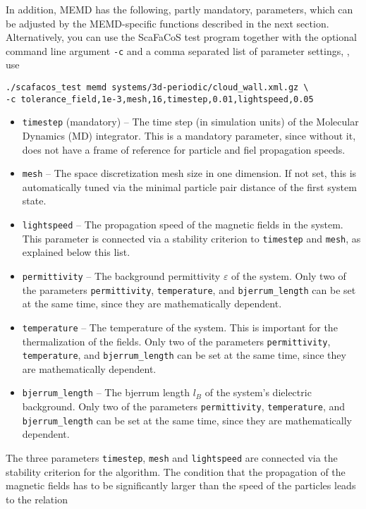 In addition, MEMD has the following, partly mandatory, parameters, which can be adjusted by the MEMD-specific functions described in the next section. Alternatively, you can use the ScaFaCoS test program together with the optional command line argument \verb!-c! and a comma separated list of parameter settings, \eg{}, use
\begin{verbatim}
./scafacos_test memd systems/3d-periodic/cloud_wall.xml.gz \
-c tolerance_field,1e-3,mesh,16,timestep,0.01,lightspeed,0.05
\end{verbatim}

\begin{itemize}
  \item \verb!timestep! (mandatory) -- The time step (in simulation units) of the Molecular Dynamics (MD) integrator. This is a mandatory parameter, since without it, \memd{} does not have a frame of reference for particle and fiel propagation speeds.
  \item \verb!mesh! -- The space discretization mesh size in one dimension. If not set, this is automatically tuned via the minimal particle pair distance of the first system state.
  \item \verb!lightspeed! -- The propagation speed of the magnetic fields in the system. This parameter is connected via a stability criterion to \verb!timestep! and \verb!mesh!, as explained below this list.
  \item \verb!permittivity! -- The background permittivity $\varepsilon$ of the system. Only two of the parameters \verb!permittivity!, \verb!temperature!, and \verb!bjerrum_length! can be set at the same time, since they are mathematically dependent.
  \item \verb!temperature! -- The temperature of the system. This is important for the thermalization of the fields. Only two of the parameters \verb!permittivity!, \verb!temperature!, and \verb!bjerrum_length! can be set at the same time, since they are mathematically dependent.
  \item \verb!bjerrum_length! -- The bjerrum length $l_B$ of the system's dielectric background. Only two of the parameters \verb!permittivity!, \verb!temperature!, and \verb!bjerrum_length! can be set at the same time, since they are mathematically dependent.
\end{itemize}

The three parameters \verb!timestep!, \verb!mesh! and \verb!lightspeed! are connected via the stability criterion for the algorithm. The condition that the propagation of the magnetic fields has to be significantly larger than the speed of the particles leads to the relation

